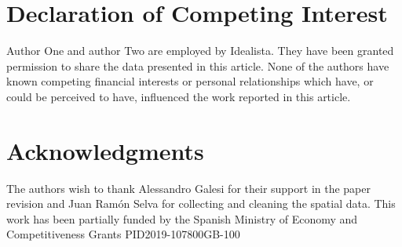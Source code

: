 \documentclass[Royal,times,sageh]{sagej}
\begin{document}
\hypertarget{declaration-of-competing-interest}{%
\section{Declaration of Competing
Interest}\label{declaration-of-competing-interest}}

Author One and author Two are employed by Idealista. They have been
granted permission to share the data presented in this article. None of
the authors have known competing financial interests or personal
relationships which have, or could be perceived to have, influenced the
work reported in this article.

\hypertarget{acknowledgments}{%
\section{Acknowledgments}\label{acknowledgments}}

The authors wish to thank Alessandro Galesi for their support in the
paper revision and Juan Ramón Selva for collecting and cleaning the
spatial data. This work has been partially funded by the Spanish
Ministry of Economy and Competitiveness Grants PID2019-107800GB-100



\end{document}
